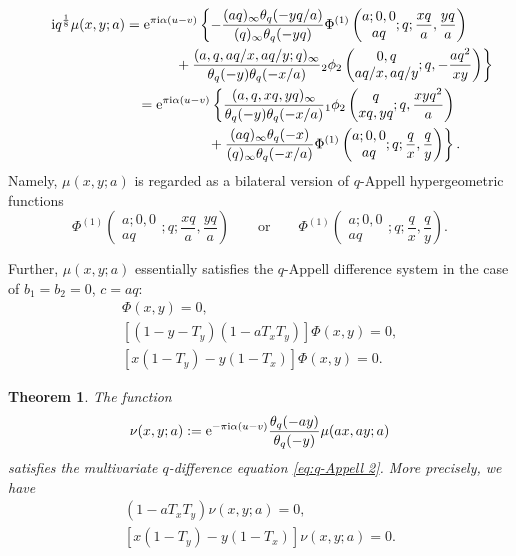 \documentclass[pdftex]{sigma}
\numberwithin{equation}{section}
\newtheorem{thm}{Theorem}[section]
\theoremstyle{definition}
\begin{document}
\begin{gather*}
{\rm i}q^{\frac{1}{8}}\mu(x,y;a)
 =
 {\rm e}^{\pi{\rm i}\alpha(u-v)}\left\{-\frac{(aq)_\infty\theta_q(-yq/a)}{(q)_\infty\theta_q(-yq)}\Phi^{(1)}\left(\begin{matrix}a;0,0 \\ aq \end{matrix};q;\frac{xq}{a},\frac{yq}{a}\right) \right. \nonumber\\
\left.
\hphantom{{\rm i}q^{\frac{1}{8}}\mu(x,y;a) =
 {\rm e}^{\pi{\rm i}\alpha(u-v)}}{}
+\frac{(a,q,aq/x,aq/y;q)_\infty}{\theta_q(-y)\theta_q(-x/a)}{}_2\phi_2\left(\begin{matrix}0,q \\ aq/x,aq/y \end{matrix};q,-\frac{aq^2}{xy}\right)\right\} \\
\hphantom{{\rm i}q^{\frac{1}{8}}\mu(x,y;a)}{}
=
 {\rm e}^{\pi{\rm i}\alpha(u-v)}\left\{\frac{(a,q,xq,yq)_\infty}{\theta_q(-y)\theta_q(-x/a)}{}_1\phi_2\left(\begin{matrix}q \\ xq,yq \end{matrix};q,\frac{xyq^2}{a}\right) \right. \nonumber\\
\left.
\hphantom{{\rm i}q^{\frac{1}{8}}\mu(x,y;a) =
 {\rm e}^{\pi{\rm i}\alpha(u-v)}}{}
+\frac{(aq)_\infty\theta_q(-x)}{(q)_\infty\theta_q(-x/a)}\Phi^{(1)}\left(\begin{matrix}a;0,0 \\ aq \end{matrix};q;\frac{q}{x},\frac{q}{y}\right)\right\}.
\end{gather*}
Namely, $\mu(x,y;a)$ is regarded as a bilateral version of $q$-Appell hypergeometric functions
\[
\Phi^{(1)}\left(\begin{matrix}a;0,0 \\ aq \end{matrix};q;\frac{xq}{a},\frac{yq}{a}\right)
\qquad \text{or} \qquad
\Phi^{(1)}\left(\begin{matrix}a;0,0 \\ aq \end{matrix};q;\frac{q}{x},\frac{q}{y}\right).
\]

Further, $\mu(x,y;a)$ essentially satisfies the $q$-Appell difference system in the case of $b_1=b_2=0$, $c=aq$:
\begin{gather}
[(1-x-T_x)(1-aT_xT_y)]\Phi (x,y)=0, \nonumber\\
[(1-y-T_y)(1-aT_xT_y)]\Phi (x,y)=0, \nonumber\\
[x(1-T_y)-y(1-T_x)]\Phi (x,y)=0.\label{eq:q-Appell 2}
\end{gather}
\begin{thm}The function
\[
\nu(x,y;a):={\rm e}^{-\pi{\rm i}\alpha(u-v)}\frac{\theta_q(-ay)}{\theta_q(-y)}\mu(ax,ay;a)
\]
satisfies the multivariate $q$-difference equation \eqref{eq:q-Appell 2}.
More precisely, we have
\begin{gather}
\label{eq:more reduce}
(1-aT_xT_y)\nu(x,y;a)=0, \\
\label{eq:more reduce 2}
[x(1-T_y)-y(1-T_x)]\nu (x,y;a)=0.
\end{gather}
\end{thm}
\end{document}
